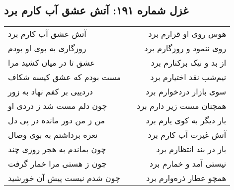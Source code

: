\begin{center}
\section*{غزل شماره ۱۹۱: آتش عشق آب کارم برد}
\label{sec:191}
\begin{longtable}{l p{0.5cm} r}
آتش عشق آب کارم برد
&&
هوس روی او قرارم برد
\\
روزگاری به بوی او بودم
&&
روی ننمود و روزگارم برد
\\
عشق تا در میان کشید مرا
&&
از بد و نیک برکنارم برد
\\
مست بودم که عشق کیسه شکاف
&&
نیم‌شب نقد اختیارم برد
\\
دردییی بر کفم نهاد به زور
&&
سوی بازار دردخوارم برد
\\
چون دلم مست شد ز دردی او
&&
همچنان مست زیر دارم برد
\\
من ز من دور مانده در پی دل
&&
بار دیگر به کوی یارم برد
\\
نعره برداشتم به بوی وصال
&&
آتش غیرت آب کارم برد
\\
چون بماندم به هجر روزی چند
&&
باز در بند انتظارم برد
\\
چون ز هستی مرا خمار گرفت
&&
نیستی آمد و خمارم برد
\\
چون شدم نیست پیش آن خورشید
&&
همچو عطار ذره‌وارم برد
\\
\end{longtable}
\end{center}
